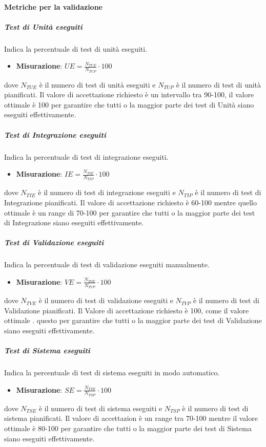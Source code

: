 \paragraph{Metriche per la validazione}


\subparagraph{Test di Unità eseguiti}
Indica la percentuale di test di unità eseguiti.
\begin{itemize}
	\item \textbf{Misurazione}: $UE=\frac{N_{TUE}}{N_{TUP}} \cdot 100$
\end{itemize}
dove $N_{TUE}$ è il numero di test di unità eseguiti e $N_{TUP}$ è il numero di test di unità pianificati.
Il valore di accettazione richiesto è un intervallo tra 90-100, il valore ottimale è 100 per garantire che tutti o la maggior parte dei test di Unità siano eseguiti effettivamente.

\subparagraph{Test di Integrazione eseguiti}
Indica la percentuale di test di integrazione eseguiti. \\
\begin{itemize}
	\item \textbf{Misurazione}: $IE=\frac{N_{TIE}}{N_{TIP}} \cdot 100$
\end{itemize}
dove $N_{TIE}$ è il numero di test di integrazione eseguiti e $N_{TIP}$ è il numero di test di Integrazione pianificati.
Il valore di accettazione richiesto è 60-100 mentre quello ottimale è un range di 70-100 per	garantire che tutti o la maggior parte dei test di Integrazione siano eseguiti effettivamente. 

\subparagraph{Test di Validazione eseguiti}
Indica la percentuale di test di validazione eseguiti manualmente.
\begin{itemize}
	\item \textbf{Misurazione}: $VE=\frac{N_{TVE}}{N_{TVP}} \cdot 100$
\end{itemize}
dove $N_{TVE}$ è il numero di test di validazione eseguiti e $N_{TVP}$ è il numero di test di Validazione pianificati.
Il Valore di accettazione richiesto è 100, come il valore ottimale . questo per garantire che tutti o la maggior parte dei test di Validazione siano eseguiti effettivamente. 

\subparagraph{Test di Sistema eseguiti}
Indica la percentuale di test di sistema eseguiti in modo automatico.
\begin{itemize}
	\item \textbf{Misurazione}: $SE=\frac{N_{TSE}}{N_{TSP}} \cdot 100$
\end{itemize}
dove $N_{TSE}$ è il numero di test di sistema eseguiti e $N_{TSP}$ è il numero di test di sistema pianificati.
Il valore di accettazion è un range tra 70-100 mentre il valore ottimale è 80-100 per garantire che tutti o la maggior parte dei test di Sistema siano eseguiti effettivamente.

